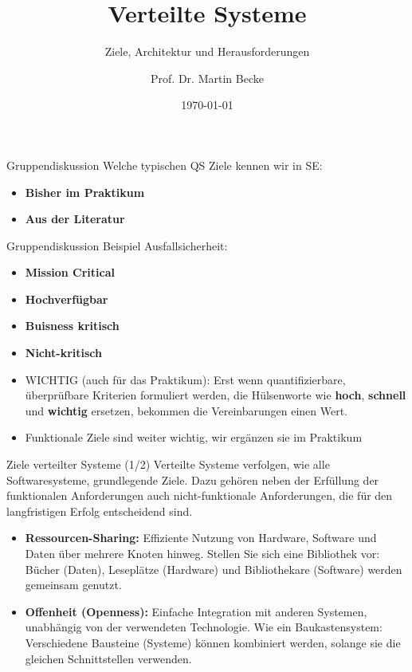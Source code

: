 \documentclass{beamer}
\title{Verteilte Systeme}
\subtitle{Ziele, Architektur und Herausforderungen}
\author{Prof. Dr. Martin Becke}
\date{\today}
\begin{document}
\begin{frame}
    \titlepage
\end{frame}


\begin{frame}{Gruppendiskussion}
    Welche typischen QS Ziele kennen wir in SE:
    \begin{itemize}
        \item \textbf{Bisher im Praktikum} 
        \item \textbf{Aus der Literatur} 
    \end{itemize}
\end{frame}


\begin{frame}{Gruppendiskussion}
    Beispiel Ausfallsicherheit:
    \begin{itemize}
        \item \textbf{Mission Critical} 
        \item \textbf{Hochverfügbar} 
        \item \textbf{Buisness kritisch} 
        \item \textbf{Nicht-kritisch} 
    \end{itemize}
    \begin{itemize}
    \item WICHTIG (auch für das Praktikum): Erst wenn quantifizierbare, überprüfbare Kriterien formuliert werden, die Hülsenworte wie
    \textbf{hoch}, \textbf{schnell} und \textbf{wichtig} ersetzen, bekommen die Vereinbarungen einen Wert.
    \item Funktionale Ziele sind weiter wichtig, wir ergänzen sie im Praktikum
    \end{itemize}
\end{frame}

\begin{frame}{Ziele verteilter Systeme (1/2)}
    Verteilte Systeme verfolgen, wie alle Softwaresysteme, grundlegende Ziele.  Dazu gehören neben der Erfüllung der funktionalen Anforderungen auch nicht-funktionale Anforderungen, die für den langfristigen Erfolg entscheidend sind.

    \begin{itemize}
        \item \textbf{Ressourcen-Sharing:}  Effiziente Nutzung von Hardware, Software und Daten über mehrere Knoten hinweg. Stellen Sie sich eine Bibliothek vor:  Bücher (Daten), Leseplätze (Hardware) und Bibliothekare (Software) werden gemeinsam genutzt.
        \item \textbf{Offenheit (Openness):} Einfache Integration mit anderen Systemen, unabhängig von der verwendeten Technologie. Wie ein Baukastensystem:  Verschiedene Bausteine (Systeme) können kombiniert werden, solange sie die gleichen Schnittstellen verwenden.
    \end{itemize}
\end{frame}
\end{document}
